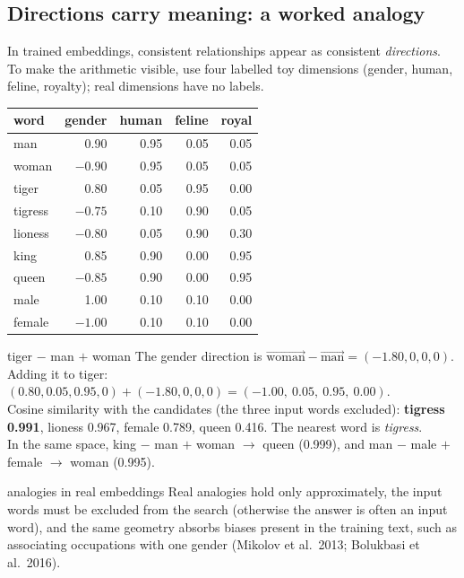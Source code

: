 \documentclass[11pt]{article}
\begin{document}
\subsection{Directions carry meaning: a worked analogy}
In trained embeddings, consistent relationships appear as consistent \emph{directions}. To make the arithmetic visible, use four labelled toy dimensions (gender, human, feline, royalty); real dimensions have no labels.
\begin{center}\small\renewcommand{\arraystretch}{1.15}
\begin{tabular}{lrrrr}\toprule
\textbf{word} & \textbf{gender} & \textbf{human} & \textbf{feline} & \textbf{royal}\\\midrule
man & 0.90 & 0.95 & 0.05 & 0.05\\
woman & $-0.90$ & 0.95 & 0.05 & 0.05\\
tiger & 0.80 & 0.05 & 0.95 & 0.00\\
tigress & $-0.75$ & 0.10 & 0.90 & 0.05\\
lioness & $-0.80$ & 0.05 & 0.90 & 0.30\\
king & 0.85 & 0.90 & 0.00 & 0.95\\
queen & $-0.85$ & 0.90 & 0.00 & 0.95\\
male & 1.00 & 0.10 & 0.10 & 0.00\\
female & $-1.00$ & 0.10 & 0.10 & 0.00\\\bottomrule
\end{tabular}\end{center}
\begin{example}{tiger $-$ man $+$ woman}
The gender direction is $\overrightarrow{\text{woman}}-\overrightarrow{\text{man}}=(-1.80,0,0,0)$. Adding it to tiger: $(0.80,0.05,0.95,0)+(-1.80,0,0,0)=(-1.00,\ 0.05,\ 0.95,\ 0.00)$.\\
Cosine similarity with the candidates (the three input words excluded): \textbf{tigress 0.991}, lioness 0.967, female 0.789, queen 0.416. The nearest word is \emph{tigress}.\\
In the same space, king $-$ man $+$ woman $\to$ queen (0.999), and man $-$ male $+$ female $\to$ woman (0.995).
\end{example}
\begin{pitfall}{analogies in real embeddings}
Real analogies hold only approximately, the input words must be excluded from the search (otherwise the answer is often an input word), and the same geometry absorbs biases present in the training text, such as associating occupations with one gender (Mikolov et al.\ 2013; Bolukbasi et al.\ 2016).
\end{pitfall}
\end{document}
